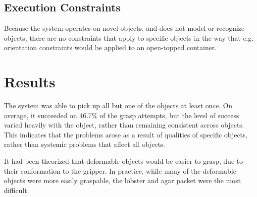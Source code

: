 \documentclass[letterpaper, 10 pt, conference]{ieeeconf}
\begin{document}
\subsection{Execution Constraints}

Because the system operates on novel objects, and does not model or recognize objects, there are no constraints that apply to specific objects in the way that e.g. orientation constraints would be applied to an open-topped container. 

\section{Results}

The system was able to pick up all but one of the objects at least once. 
On average, it succeeded on 46.7\% of the grasp attempts, but the level of success varied heavily with the object, rather than remaining consistent across objects. 
This indicates that the problems arose as a result of qualities of specific objects, rather than systemic problems that affect all objects. 

It had been theorized that deformable objects would be easier to grasp, due to their conformation to the gripper.
In practice, while many of the deformable objects were more easily graspable, the lobster and agar packet were the most difficult. 
\end{document}

